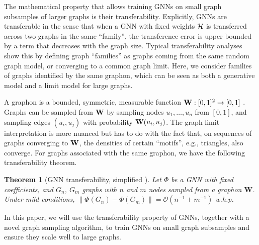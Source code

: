 \documentclass[conference]{IEEEtran}
\newtheorem{theorem}{Theorem}[section] %
\theoremstyle{definition}
\begin{document}
The mathematical property that allows training GNNs on small graph subsamples of larger graphs is their transferability. Explicitly, GNNs are transferable in the sense that when a GNN with fixed weights ${\mathcal H}$ is transferred across two graphs in the same ``family'', the transference error is upper bounded by a term that decreases with the graph size. Typical transferability analyses show this by defining graph ``families'' as graphs coming from the same random graph model, or converging to a common graph limit. Here, we consider families of graphs identified by the same graphon, which can be seen as both a generative model and a limit model for large graphs. 

A graphon is a bounded, symmetric, measurable function ${\mathbf W}: [0,1]^2 \to [0,1]$ \cite{borgs2008convergent,lovasz2012large}. Graphs can be sampled from ${\mathbf W}$ by sampling nodes $u_1, \ldots, u_n$ from $[0,1]$, and sampling edges $(u_i,u_j)$ with probability ${\mathbf W}(u_i,u_j)$. The graph limit interpretation is more nuanced but has to do with the fact that, on sequences of graphs converging to ${\mathbf W}$, the densities of certain ``motifs'', e.g., triangles, also converge. For graphs associated with the same graphon, we have the following transferability theorem.

\begin{theorem}[GNN transferability, simplified \cite{ruiz2021transferability}]
    Let $\Phi$ be a GNN with fixed coefficients, and $G_n$, $G_m$ graphs with $n$ and $m$ nodes sampled from a graphon $\mathbf{W}$. Under mild conditions, $\| {\Phi}(G_n) - {\Phi}(G_m) \|= \mathcal{O}(n^{-1} + m^{-1})$ w.h.p.
\end{theorem}

In this paper, we will use the transferability property of GNNs, together with a novel graph sampling algorithm, to train GNNs on small graph subsamples and ensure they scale well to large graphs.
\end{document}
